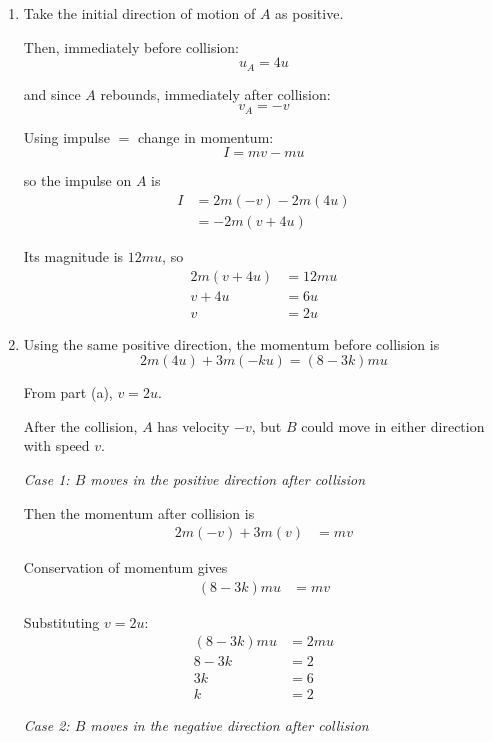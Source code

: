 \documentclass[leqno]{article}
\begin{document}
\begin{enumerate}[
  label=\textbf{\arabic*.},
  leftmargin=*,
  topsep=0pt,
  partopsep=0pt,
  parsep=0pt
]
\vspace*{10pt}

\begin{djsSolution}
\begin{enumerate}[label=\textbf{(\alph*)}]
  \item Take the initial direction of motion of $A$ as positive.

  Then, immediately before collision:
  \[
  u_A=4u
  \]

  and since $A$ rebounds, immediately after collision:
  \[
  v_A=-v
  \]

  Using impulse \(=\) change in momentum:
  \[
  I=mv-mu
  \]

  so the impulse on $A$ is
  \begin{align*}
  I&=2m(-v)-2m(4u) \\
  &=-2m(v+4u)
  \end{align*}

  Its magnitude is $12mu$, so
  \begin{align*}
  2m(v+4u)&=12mu \\
  v+4u&=6u \\
  v&=2u
  \end{align*}


  \item Using the same positive direction, the momentum before collision is
  \[
  2m(4u)+3m(-ku)=(8-3k)mu
  \]

  From part (a), $v=2u$.

  After the collision, $A$ has velocity $-v$, but $B$ could move in either direction with speed $v$.

  \textit{Case 1: $B$ moves in the positive direction after collision}

  Then the momentum after collision is
  \begin{align*}
  2m(-v)+3m(v)&=mv
  \end{align*}

  Conservation of momentum gives
  \begin{align*}
  (8-3k)mu&=mv
  \end{align*}

  Substituting $v=2u$:
  \begin{align*}
  (8-3k)mu&=2mu \\
  8-3k&=2 \\
  3k&=6 \\
  k&=2
  \end{align*}

  \textit{Case 2: $B$ moves in the negative direction after collision}


\end{enumerate}
\end{djsSolution}
\end{enumerate}
\end{document}
